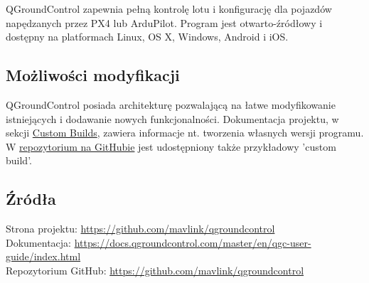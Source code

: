 \documentclass{article}
\begin{document}
QGroundControl zapewnia pełną kontrolę lotu i konfigurację dla pojazdów napędzanych przez PX4 lub ArduPilot. Program jest otwarto-źródłowy i dostępny na platformach Linux, OS X, Windows, Android i iOS.

\subsection{Możliwości modyfikacji}
QGroundControl posiada architekturę pozwalającą na łatwe modyfikowanie istniejących i dodawanie nowych funkcjonalności. Dokumentacja projektu, w sekcji \href{https://docs.qgroundcontrol.com/master/en/qgc-dev-guide/custom_build/custom_build.html}{Custom Builds}, zawiera informacje nt. tworzenia własnych wersji programu.
W \href{https://github.com/mavlink/qgroundcontrol/tree/master/custom-example}{repozytorium na GitHubie} jest udostępniony także przykładowy 'custom build'.

\subsection{Źródła}
Strona projektu: \url{https://github.com/mavlink/qgroundcontrol}\\
Dokumentacja: \url{https://docs.qgroundcontrol.com/master/en/qgc-user-guide/index.html}\\
Repozytorium GitHub: \url{https://github.com/mavlink/qgroundcontrol}
\end{document}
